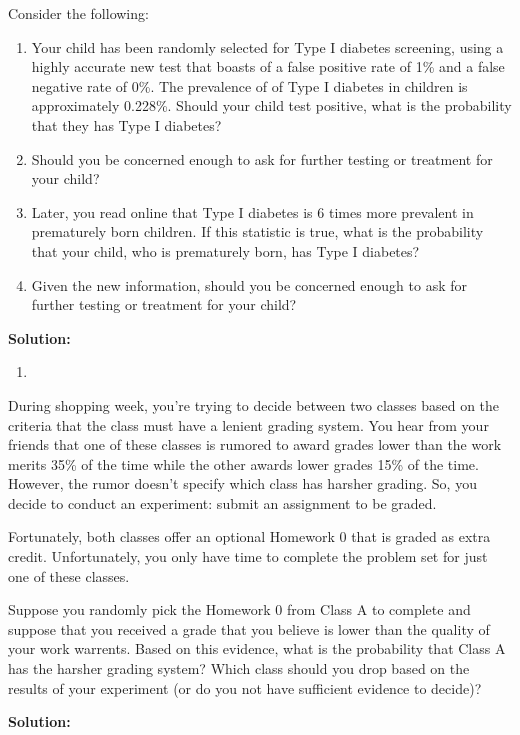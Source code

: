 \documentclass{harvardml}
\theoremstyle{definition}
\theoremstyle{plain}
\begin{document}
\begin{problem}
Consider the following:
\begin{enumerate}[label=(\alph*)]
\item Your child has been randomly selected for Type I diabetes screening, using
a highly accurate new test that boasts of a false positive rate of 1\% and a
false negative rate of 0\%. The prevalence of of Type I diabetes in children is
approximately 0.228\%. Should your child test positive, what is the probability
that they has Type I diabetes?

\item Should you be concerned enough to ask for further testing or treatment for
your child?

\item Later, you read online that Type I diabetes is 6 times more prevalent in
prematurely born children. If this statistic is true, what is the probability
that your child, who is prematurely born, has Type I diabetes?

\item Given the new information, should you be concerned enough to ask for
further testing or treatment for your child?
\end{enumerate}

\textbf{Solution:}
\begin{enumerate}[label=(\alph*)]
\item
\end{enumerate}

\end{problem}

\begin{problem}
During shopping week, you're trying to decide between two classes based on the
criteria that the class must have a lenient grading system. You hear from your
friends that one of these classes is rumored to award grades lower than the work
merits 35\% of the time while the other awards lower grades 15\% of the time.
However, the rumor doesn't specify which class has harsher grading. So, you
decide to conduct an experiment: submit an assignment to be graded. 

Fortunately, both classes offer an optional Homework 0 that is graded as extra
credit. Unfortunately, you only have time to complete the problem set for just
one of these classes. 

Suppose you randomly pick the Homework 0 from Class A to complete and suppose
that you received a grade that you believe is lower than the quality of your
work warrents. Based on this evidence, what is the probability that Class A has
the harsher grading system? Which class should you drop based on the results of
your experiment (or do you not have sufficient evidence to decide)?

\textbf{Solution:}

\end{problem}
\end{document}
